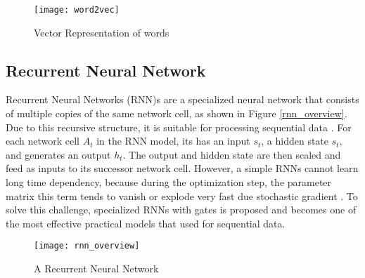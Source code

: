 \begin{figure}[htb]
	\centering
	\texttt{[image: word2vec]}
	\caption{Vector Representation of words}
	\label{fig:word2vec}
\end{figure}


\subsection{Recurrent Neural Network}  
Recurrent Neural Networks (RNN)s are a specialized neural network that consists of multiple copies of the same network cell, as shown in Figure \ref{rnn_overview}.
%
Due to this recursive structure, it is suitable for processing sequential data  \cite{rumelhart1986}.
%
%
For each network cell $A_t$ in the RNN model, its has an input $s_t$, a hidden state $s_t$, and generates an output $h_t$.
%
The output and hidden state are then scaled and feed as inputs to its successor network cell.
%
However, a simple RNNs cannot learn long time dependency, because during the optimization step, the parameter matrix this term tends to vanish or explode very fast due stochastic gradient \cite{goodfellow2016deeplearning}.
%
To solve this challenge, specialized RNNs with gates is proposed and becomes one of the most effective practical models that used for sequential data.
\begin{figure}[htbp]
	\centering
	\texttt{[image: rnn\_overview]}
	\caption{A Recurrent Neural Network}
	\label{fig:rnn_overview}
\end{figure}




